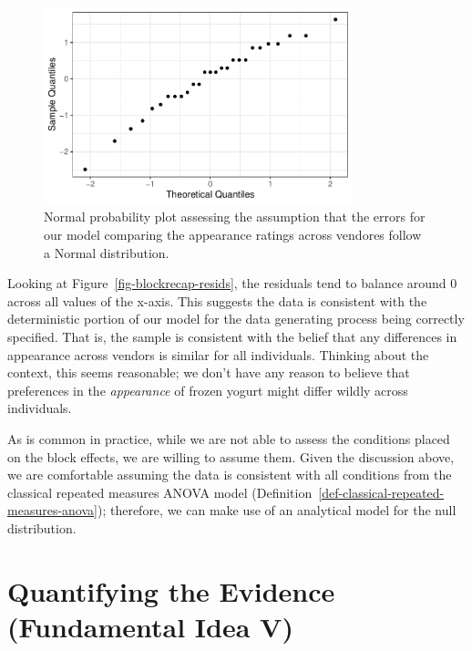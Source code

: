 \documentclass[
  letterpaper,
  DIV=11,
  numbers=noendperiod]{scrreprt}
\theoremstyle{plain}
\theoremstyle{definition}
\theoremstyle{definition}
\theoremstyle{remark}
\begin{document}
\begin{figure}

{\centering \includegraphics[width=0.8\textwidth,height=\textheight]{./images/fig-blockrecap-probplot-1.pdf}

}

\caption{\label{fig-blockrecap-probplot}Normal probability plot
assessing the assumption that the errors for our model comparing the
appearance ratings across vendores follow a Normal distribution.}

\end{figure}

Looking at Figure~\ref{fig-blockrecap-resids}, the residuals tend to
balance around 0 across all values of the x-axis. This suggests the data
is consistent with the deterministic portion of our model for the data
generating process being correctly specified. That is, the sample is
consistent with the belief that any differences in appearance across
vendors is similar for all individuals. Thinking about the context, this
seems reasonable; we don't have any reason to believe that preferences
in the \emph{appearance} of frozen yogurt might differ wildly across
individuals.

As is common in practice, while we are not able to assess the conditions
placed on the block effects, we are willing to assume them. Given the
discussion above, we are comfortable assuming the data is consistent
with all conditions from the classical repeated measures ANOVA model
(Definition~\ref{def-classical-repeated-measures-anova}); therefore, we
can make use of an analytical model for the null distribution.

\hypertarget{quantifying-the-evidence-fundamental-idea-v-2}{%
\section{Quantifying the Evidence (Fundamental Idea
V)}\label{quantifying-the-evidence-fundamental-idea-v-2}}
\end{document}

